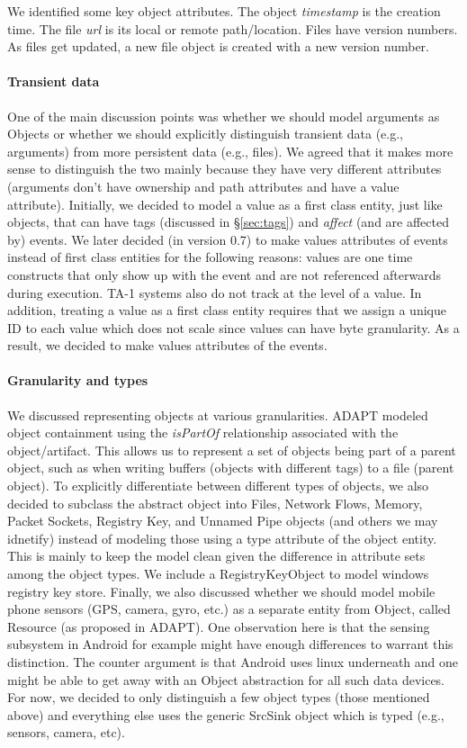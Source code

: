 \documentclass[10pt, conference, onecolumn]{IEEEtran}
\begin{document}
We identified some key object attributes. The object
\textit{timestamp} is the creation time.  The file \textit{url} is its
local or remote path/location. Files have version numbers. As files
get updated, a new file object is created with a new version number.

\paragraph{Transient data} 

One of the main discussion points was whether we should model
arguments as Objects or whether we should explicitly distinguish
transient data (e.g., arguments) from more persistent data (e.g.,
files).  We agreed that it makes more sense to distinguish the two
mainly because they have very different attributes (arguments don't
have ownership and path attributes and have a value attribute).
Initially, we decided to model a value as a first class entity, just
like objects, that can have tags (discussed in \S \ref{sec:tags}) and
\textit{affect} (and are affected by) events.  We later decided (in
version 0.7) to make values attributes of events instead of first
class entities for the following reasons: values are one time
constructs that only show up with the event and are not referenced
afterwards during execution. TA-1 systems also do not track at the
level of a value. In addition, treating a value as a first class
entity requires that we assign a unique ID to each value which does
not scale since values can have byte granularity. As a result, we
decided to make values attributes of the events.

\paragraph{Granularity and types}

We discussed representing objects at various granularities. ADAPT
modeled object containment using the \textit{isPartOf} relationship
associated with the object/artifact. This allows us to represent a set
of objects being part of a parent object, such as when writing buffers
(objects with different tags) to a file (parent object). To explicitly
differentiate between different types of objects, we also decided to
subclass the abstract object into Files, Network Flows, Memory, Packet
Sockets, Registry Key, and Unnamed Pipe objects (and others we may
idnetify) instead of modeling those using a type attribute of the
object entity. This is mainly to keep the model clean given the
difference in attribute sets among the object types.  We include a
RegistryKeyObject to model windows registry key store.  Finally, we
also discussed whether we should model mobile phone sensors (GPS,
camera, gyro, etc.) as a separate entity from Object, called Resource
(as proposed in ADAPT). One observation here is that the sensing
subsystem in Android for example might have enough differences to
warrant this distinction. The counter argument is that Android uses
linux underneath and one might be able to get away with an Object
abstraction for all such data devices. For now, we decided to only
distinguish a few object types (those mentioned above) and everything
else uses the generic SrcSink object which is typed (e.g., sensors,
camera, etc).
\end{document}
